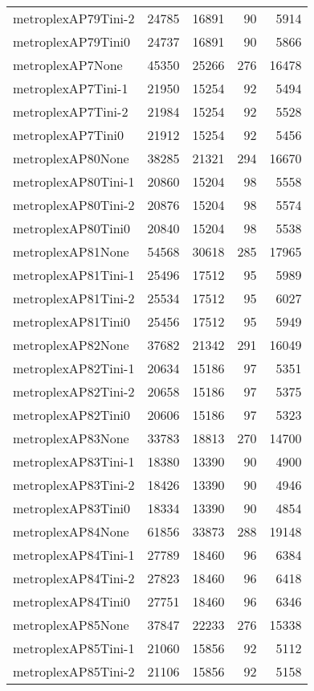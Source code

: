 \begin{longtable}{lrrrr}
metroplexAP79Tini-2 & 24785 & 16891 & 90 & 5914 \\
metroplexAP79Tini0 & 24737 & 16891 & 90 & 5866 \\
metroplexAP7None & 45350 & 25266 & 276 & 16478 \\
metroplexAP7Tini-1 & 21950 & 15254 & 92 & 5494 \\
metroplexAP7Tini-2 & 21984 & 15254 & 92 & 5528 \\
metroplexAP7Tini0 & 21912 & 15254 & 92 & 5456 \\
metroplexAP80None & 38285 & 21321 & 294 & 16670 \\
metroplexAP80Tini-1 & 20860 & 15204 & 98 & 5558 \\
metroplexAP80Tini-2 & 20876 & 15204 & 98 & 5574 \\
metroplexAP80Tini0 & 20840 & 15204 & 98 & 5538 \\
metroplexAP81None & 54568 & 30618 & 285 & 17965 \\
metroplexAP81Tini-1 & 25496 & 17512 & 95 & 5989 \\
metroplexAP81Tini-2 & 25534 & 17512 & 95 & 6027 \\
metroplexAP81Tini0 & 25456 & 17512 & 95 & 5949 \\
metroplexAP82None & 37682 & 21342 & 291 & 16049 \\
metroplexAP82Tini-1 & 20634 & 15186 & 97 & 5351 \\
metroplexAP82Tini-2 & 20658 & 15186 & 97 & 5375 \\
metroplexAP82Tini0 & 20606 & 15186 & 97 & 5323 \\
metroplexAP83None & 33783 & 18813 & 270 & 14700 \\
metroplexAP83Tini-1 & 18380 & 13390 & 90 & 4900 \\
metroplexAP83Tini-2 & 18426 & 13390 & 90 & 4946 \\
metroplexAP83Tini0 & 18334 & 13390 & 90 & 4854 \\
metroplexAP84None & 61856 & 33873 & 288 & 19148 \\
metroplexAP84Tini-1 & 27789 & 18460 & 96 & 6384 \\
metroplexAP84Tini-2 & 27823 & 18460 & 96 & 6418 \\
metroplexAP84Tini0 & 27751 & 18460 & 96 & 6346 \\
metroplexAP85None & 37847 & 22233 & 276 & 15338 \\
metroplexAP85Tini-1 & 21060 & 15856 & 92 & 5112 \\
metroplexAP85Tini-2 & 21106 & 15856 & 92 & 5158 \\

\end{longtable}
